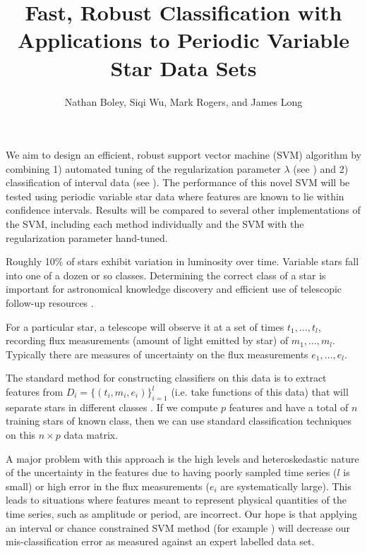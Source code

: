 \documentclass[11pt]{article}
\begin{document}
\title{Fast, Robust Classification with Applications to Periodic Variable Star Data Sets}
\author{Nathan Boley, Siqi Wu, Mark Rogers, and James Long}
\maketitle
We aim to design an efficient, robust support vector machine (SVM) algorithm by combining 1) automated tuning of the regularization parameter $\lambda$ (see \cite{hastie2004entire}) and 2) classification of interval data (see \cite{el2003robust}). The performance of this novel SVM will be tested using periodic variable star data where features are known to lie within confidence intervals. Results will be compared to several other implementations of the SVM, including each method individually and the SVM with the regularization parameter hand-tuned.

Roughly 10\% of stars exhibit variation in luminosity over time. Variable stars fall into one of a dozen or so classes. Determining the correct class of a star is important for astronomical knowledge discovery and efficient use of telescopic follow-up resources \cite{walkowicz2009impact}.

For a particular star, a telescope will observe it at a set of times $t_{1},\ldots,t_{l}$, recording flux measurements (amount of light emitted by star) of $m_{1},\ldots,m_{l}$. Typically there are measures of uncertainty on the flux measurements $e_{1},\ldots,e_{l}$.

The standard method for constructing classifiers on this data is to extract features from $D_{i}=\{(t_{i},m_{i},e_{i})\}_{i=1}^{l}$ (i.e. take functions of this data) that will separate stars in different classes \cite{richards2011machine,debosscher2007automated}. If we compute $p$ features and have a total of $n$ training stars of known class, then we can use standard classification techniques on this $n\times p$ data matrix.

A major problem with this approach is the high levels and heteroskedastic nature of the uncertainty in the features due to having poorly sampled time series ($l$ is small) or high error in the flux measurements ($e_{i}$ are systematically large). This leads to situations where features meant to represent physical quantities of the time series, such as amplitude or period, are incorrect. Our hope is that applying an interval or chance constrained SVM method (for example \cite{el2003robust,calafiore2006distributionally}) will decrease our mis-classification error as measured against an expert labelled data set.
\end{document}
